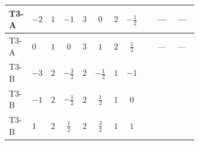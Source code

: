 \documentclass[8pt]{article}
\begin{document}
\begin{landscape}
\begin{longtable}{@{}llcccccc >{\raggedright\arraybackslash}p{0.21\linewidth} >{\raggedright\arraybackslash}p{0.21\linewidth} >{\raggedright\arraybackslash}p{0.21\linewidth}@{}}
\midrule
T3-A & $-2$ & $1$ & $-1$ & $3$ & $0$ & $2$ & $-\frac{1}{2}$ & \scriptsize\adjustbox{max width=\linewidth}{$\begin{gathered} +4 {\lambda_{HS_1}^{(1)}} {\lambda_{HS_2}^{(1)}}\end{gathered}$} & --- & --- \\
\midrule
T3-A & $0$ & $1$ & $0$ & $3$ & $1$ & $2$ & $\frac{1}{2}$ & \scriptsize\adjustbox{max width=\linewidth}{$\begin{gathered} +4 {\lambda_{HS_1}^{(1)}} {\lambda_{HS_2}^{(1)}}\end{gathered}$} & --- & --- \\
\midrule
T3-B & $-3$ & $2$ & $-\frac{3}{2}$ & $2$ & $-\frac{1}{2}$ & $1$ & $-1$ & \scriptsize\adjustbox{max width=\linewidth}{$\begin{gathered} +4 {\lambda_{HS_1}^{(1)}} {\lambda_{HS_2}^{(1)}}\end{gathered}$} & \scriptsize\adjustbox{max width=\linewidth}{$\begin{gathered} {\lambda_{12}^{(1)}} (2 T_{\nu}^{(1)}+2 T_{\nu}^{(2)})\end{gathered}$} & \scriptsize\adjustbox{max width=\linewidth}{$\begin{gathered} +\frac{9 {g_2}^4}{4}\end{gathered}$} \\
\midrule
T3-B & $-1$ & $2$ & $-\frac{1}{2}$ & $2$ & $\frac{1}{2}$ & $1$ & $0$ & \scriptsize\adjustbox{max width=\linewidth}{$\begin{gathered} +4 {\lambda_{HS_1}^{(1)}} {\lambda_{HS_2}^{(1)}}\end{gathered}$} & \scriptsize\adjustbox{max width=\linewidth}{$\begin{gathered} {\lambda_{12}^{(1)}} (2 T_{\nu}^{(1)}+2 T_{\nu}^{(2)})\end{gathered}$} & \scriptsize\adjustbox{max width=\linewidth}{$\begin{gathered} +\frac{9 {g_2}^4}{4}\end{gathered}$} \\
\midrule
T3-B & $1$ & $2$ & $\frac{1}{2}$ & $2$ & $\frac{3}{2}$ & $1$ & $1$ & \scriptsize\adjustbox{max width=\linewidth}{$\begin{gathered} +4 {\lambda_{HS_1}^{(1)}} {\lambda_{HS_2}^{(1)}}\end{gathered}$} & \scriptsize\adjustbox{max width=\linewidth}{$\begin{gathered} {\lambda_{12}^{(1)}} (2 T_{\nu}^{(1)}+2 T_{\nu}^{(2)})\end{gathered}$} & \scriptsize\adjustbox{max width=\linewidth}{$\begin{gathered} +\frac{9 {g_2}^4}{4}\end{gathered}$} \\

\end{longtable}
\end{landscape}
\end{document}
